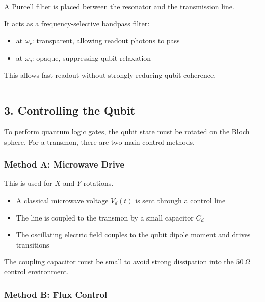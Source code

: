 \documentclass[
]{article}
\providecommand{\tightlist}{%
  \setlength{\itemsep}{0pt}\setlength{\parskip}{0pt}}
\begin{document}
A Purcell filter is placed between the resonator and the transmission
line.

It acts as a frequency-selective bandpass filter:

\begin{itemize}
\tightlist
\item
  at \(\omega_r\): transparent, allowing readout photons to pass
\item
  at \(\omega_q\): opaque, suppressing qubit relaxation
\end{itemize}

This allows fast readout without strongly reducing qubit coherence.

\begin{center}\rule{0.5\linewidth}{0.5pt}\end{center}

\subsection{3. Controlling the Qubit}\label{controlling-the-qubit}

To perform quantum logic gates, the qubit state must be rotated on the
Bloch sphere. For a transmon, there are two main control methods.

\subsubsection{Method A: Microwave
Drive}\label{method-a-microwave-drive}

This is used for \(X\) and \(Y\) rotations.

\begin{itemize}
\tightlist
\item
  A classical microwave voltage \(V_d(t)\) is sent through a control
  line
\item
  The line is coupled to the transmon by a small capacitor \(C_d\)
\item
  The oscillating electric field couples to the qubit dipole moment and
  drives transitions
\end{itemize}

The coupling capacitor must be small to avoid strong dissipation into
the \(50\,\Omega\) control environment.

\subsubsection{Method B: Flux Control}\label{method-b-flux-control}
\end{document}
